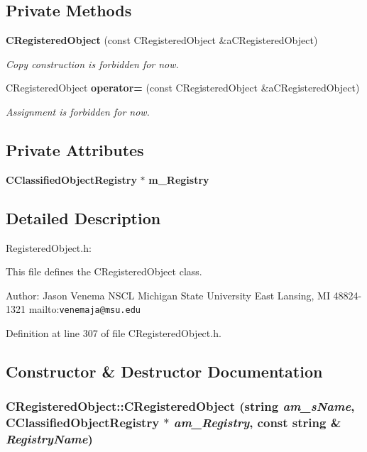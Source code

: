 \subsection*{Private Methods}
\begin{CompactItemize}
\item 
{\bf CRegistered\-Object} (const CRegistered\-Object \&a\-CRegistered\-Object)
\begin{CompactList}\small\item\em Copy construction is forbidden for now.\item\end{CompactList}\item 
CRegistered\-Object {\bf operator=} (const CRegistered\-Object \&a\-CRegistered\-Object)
\begin{CompactList}\small\item\em Assignment is forbidden for now.\item\end{CompactList}\end{CompactItemize}
\subsection*{Private Attributes}
\begin{CompactItemize}
\item 
{\bf CClassified\-Object\-Registry} $\ast$ {\bf m\_\-Registry}
\end{CompactItemize}


\subsection{Detailed Description}
Registered\-Object.h:

This file defines the CRegistered\-Object class.

Author: Jason Venema NSCL Michigan State University East Lansing, MI 48824-1321 mailto:{\tt venemaja@msu.edu} 



Definition at line 307 of file CRegistered\-Object.h.

\subsection{Constructor \& Destructor Documentation}
\subsubsection{\setlength{\rightskip}{0pt plus 5cm}CRegistered\-Object::CRegistered\-Object (string {\em am\_\-s\-Name}, {\bf CClassified\-Object\-Registry} $\ast$ {\em am\_\-Registry}, const string \& {\em Registry\-Name})\hspace{0.3cm}{\tt  [inline]}}\label{classCRegisteredObject_a0}


